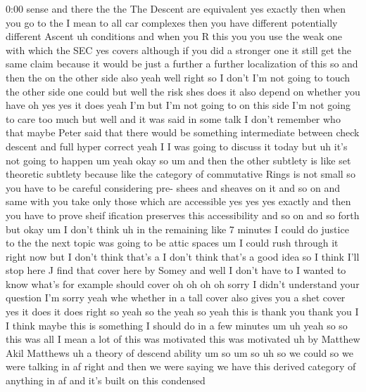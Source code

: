 \begin{unfinished}{0:00}
sense  and  there  the  the  The  Descent  are
equivalent  yes  exactly  then  when  you  go
to  the  I  mean  to  all  car  complexes  then
you  have
different  potentially  different  Ascent
uh  conditions  and  when  you  R  this  you
you  use  the  weak  one  with  which  the  SEC
yes  covers  although  if  you  did  a
stronger  one  it  still  get  the  same  claim
because  it  would  be  just  a  further  a
further  localization  of  this  so  and  then
the  on  the  other  side  also  yeah  well
right  so  I  don't  I'm  not  going  to  touch
the  other  side  one  could  but  well  the
risk  shes  does  it  also  depend  on  whether
you  have  oh  yes  yes  it  does  yeah  I'm  but
I'm  not  going  to  on  this  side  I'm  not
going  to  care  too  much  but  well  and  it
was  said  in  some  talk  I  don't  remember
who  that  maybe  Peter  said  that  there
would  be  something  intermediate  between
check  descent  and  full  hyper  correct
yeah  I  I  was  going  to  discuss  it  today
but  uh  it's  not  going  to  happen
um  yeah  okay
so  um  and  then  the  other  subtlety  is
like  set  theoretic  subtlety  because  like
the  category  of  commutative  Rings  is  not
small  so  you  have  to  be  careful
considering  pre-  shees  and  sheaves  on  it
and  so  on  and  same  with  you  take  only
those  which  are  accessible  yes  yes  yes
exactly  and  then  you  have  to  prove  sheif
ification  preserves  this  accessibility
and  so  on  and  so  forth  but  okay
um  I  don't  think  uh  in  the  remaining
like  7  minutes  I  could  do  justice  to  the
the  next  topic  was  going  to  be  attic
spaces  um  I  could  rush  through  it  right
now  but  I  don't  think  that's  a  I  don't
think  that's  a  good  idea  so  I  think  I'll
stop
here
J  find  that  cover  here  by
Somey  and  well  I  don't  have  to  I  wanted
to  know  what's  for
example  should
cover  oh  oh  oh  oh  sorry  I  didn't
understand  your  question  I'm  sorry  yeah
whe  whether  in  a  tall  cover  also  gives
you  a  shet  cover  yes  it  does  it
does  right  so  yeah  so  the  yeah  so  yeah
this  is  thank  you  thank  you  I  I  think
maybe  this  is  something  I  should  do  in  a
few  minutes  um  uh  yeah
so  so  this  was  all  I  mean  a  lot  of  this
was
motivated  this  was  motivated
uh  by  Matthew  Akil  Matthews
uh  a  theory  of  descend
ability  um  so  um
so  uh  so  we  could  so  we  were  talking  in
af  right  and  then  we  were  saying  we  have
this  derived  category  of  anything  in  af
and  it's  built  on  this  condensed

\end{unfinished}
